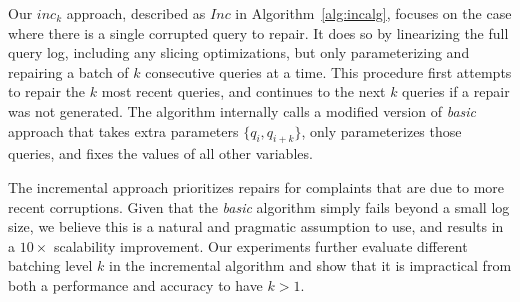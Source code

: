 Our \emph{$inc_k$} approach, described as $Inc$ in Algorithm~\ref{alg:incalg}, focuses on the case where there is a single corrupted query to repair.
It does so by linearizing the full query log, including any slicing optimizations, but only parameterizing and repairing a batch of $k$ consecutive queries at a time. 
This procedure first attempts to repair the $k$ most recent queries, and continues to the next $k$ queries if a repair was not generated.
The algorithm internally calls a modified version of \emph{basic} approach that takes extra parameters $\{q_i, q_{i+k}\}$, only parameterizes those queries, and fixes the values of all other variables.

The incremental approach prioritizes repairs for complaints that are due to more recent corruptions.
Given that the \emph{basic} algorithm simply fails beyond a small log size, we believe this is a natural and pragmatic assumption to use, and results in 
a $10\times$ scalability improvement.
Our experiments further evaluate different batching level $k$ in the incremental algorithm and show that it is impractical from both a performance and accuracy to have $k > 1$.






